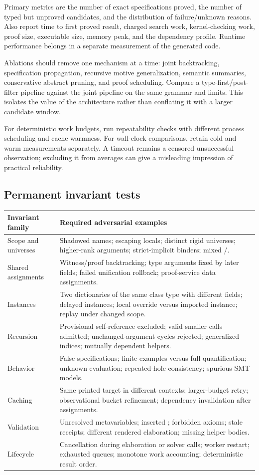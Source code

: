 \documentclass[11pt,letterpaper]{article}
\newcommand{\id}[1]{\texttt{\detokenize{#1}}}
\theoremstyle{definition}
\theoremstyle{remark}
\begin{document}
Primary metrics are the number of exact specifications proved, the number of typed but unproved candidates, and the distribution of failure/unknown reasons. Also report time to first proved result, charged search work, kernel-checking work, proof size, executable size, memory peak, and the dependency profile. Runtime performance belongs in a separate measurement of the generated code.

Ablations should remove one mechanism at a time: joint backtracking, specification propagation, recursive motive generalization, semantic summaries, conservative abstract pruning, and proof scheduling. Compare a type-first/post-filter pipeline against the joint pipeline on the same grammar and limits. This isolates the value of the architecture rather than conflating it with a larger candidate window.

For deterministic work budgets, run repeatability checks with different process scheduling and cache warmness. For wall-clock comparisons, retain cold and warm measurements separately. A timeout remains a censored unsuccessful observation; excluding it from averages can give a misleading impression of practical reliability.

\subsection{Permanent invariant tests}

\begin{longtable}{@{}L{0.30\textwidth}L{0.64\textwidth}@{}}
\toprule
Invariant family & Required adversarial examples \\
\midrule
\endhead
Scope and universes & Shadowed names; escaping locals; distinct rigid universes; higher-rank arguments; strict-implicit binders; mixed \id{Prop}/\id{Type}. \\
Shared assignments & Witness/proof backtracking; type arguments fixed by later fields; failed unification rollback; proof-service data assignments. \\
Instances & Two dictionaries of the same class type with different fields; delayed instances; local override versus imported instance; replay under changed scope. \\
Recursion & Provisional self-reference excluded; valid smaller calls admitted; unchanged-argument cycles rejected; generalized indices; mutually dependent helpers. \\
Behavior & False specifications; finite examples versus full quantification; unknown evaluation; repeated-hole consistency; spurious SMT models. \\
Caching & Same printed target in different contexts; larger-budget retry; observational bucket refinement; dependency invalidation after assignments. \\
Validation & Unresolved metavariables; inserted \id{sorryAx}; forbidden axioms; stale receipts; different rendered elaboration; missing helper bodies. \\
Lifecycle & Cancellation during elaboration or solver calls; worker restart; exhausted queues; monotone work accounting; deterministic result order. \\
\bottomrule
\end{longtable}
\end{document}
